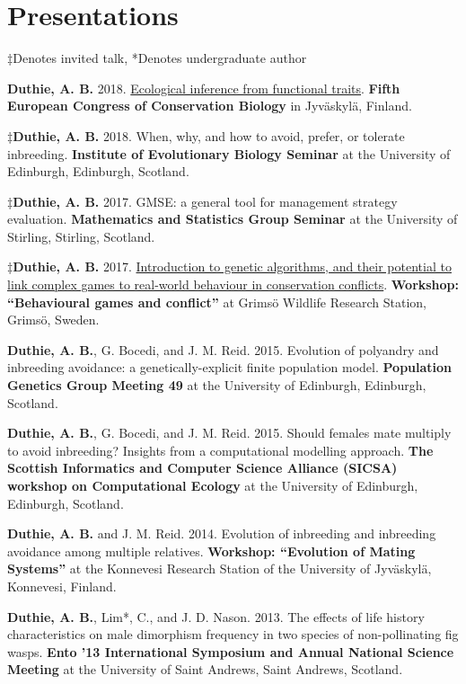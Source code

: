 \documentclass[letterpaper]{article}
\renewenvironment{itemize}{
  \begin{list}{}{
    \setlength{\leftmargin}{1.5em}
  }
}{
  \end{list}
}
\begin{document}
\section*{Presentations}
\begin{itemize}
\item $\ddagger$Denotes invited talk, *Denotes undergraduate author
\item {\bf Duthie, A. B.} 2018. \href{https://www.dropbox.com/s/v42iqdccpkyg55w/Duthie_ECCB2018.pdf?dl=0}{Ecological inference from functional traits}. {\bf Fifth European Congress of Conservation Biology} in Jyv\"{a}skyl\"{a}, Finland.
\item $\ddagger${\bf Duthie, A. B.} 2018. When, why, and how to avoid, prefer, or tolerate inbreeding. {\bf Institute of Evolutionary Biology Seminar} at the University of Edinburgh, Edinburgh, Scotland.
\item $\ddagger${\bf Duthie, A. B.} 2017. GMSE: a general tool for management strategy evaluation. {\bf Mathematics and Statistics Group Seminar} at the University of Stirling, Stirling, Scotland.
\item $\ddagger${\bf Duthie, A. B.} 2017. \href{https://bradduthie.shinyapps.io/GRIMSO}{Introduction to genetic algorithms, and their potential to link complex games to real-world behaviour in conservation conflicts}. {\bf Workshop: ``Behavioural games and conflict''} at Grims\"{o} Wildlife Research Station, Grims\"{o}, Sweden.
\item {\bf Duthie, A. B.}, G. Bocedi, and J. M. Reid. 2015. Evolution of polyandry and inbreeding avoidance: a genetically-explicit finite population model. {\bf Population Genetics Group Meeting 49} at the University of Edinburgh, Edinburgh, Scotland.
\item {\bf Duthie, A. B.}, G. Bocedi, and J. M. Reid. 2015. Should females mate multiply to avoid inbreeding? Insights from a computational modelling approach. {\bf The Scottish Informatics and Computer Science Alliance (SICSA) workshop on Computational Ecology} at the University of Edinburgh, Edinburgh, Scotland.
\item {\bf Duthie, A. B.} and J. M. Reid. 2014. Evolution of inbreeding and inbreeding avoidance among multiple relatives. {\bf Workshop: ``Evolution of Mating Systems''} at the Konnevesi Research Station of the University of Jyv\"{a}skyl\"{a}, Konnevesi, Finland.
\item {\bf Duthie, A. B.}, Lim*, C., and J. D. Nason. 2013. The effects of life history characteristics on male dimorphism frequency in two species of non-pollinating fig wasps. {\bf Ento '13 International Symposium and Annual National Science Meeting} at the University of Saint Andrews, Saint Andrews, Scotland.

\end{itemize}
\end{document}

